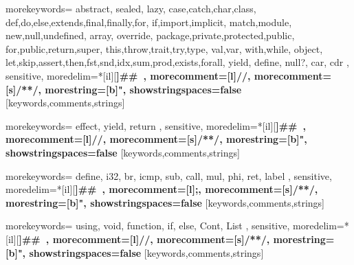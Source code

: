 

%
{morekeywords={
  abstract, sealed, lazy,
  case,catch,char,class,%
  def,do,else,extends,final,finally,for,%
  if,import,implicit,%
  match,module,%
  new,null,undefined,%
  array,
  override,%
  package,private,protected,public,%
  for,public,return,super,%
  this,throw,trait,try,type,%
  val,var,%
  with,while,%
  object,
  let,skip,assert,then,fst,snd,idx,sum,prod,exists,forall,%
  yield,%
  define, null?, car, cdr
  },%
  sensitive,%
  moredelim=*[il][\bfseries]{\#\#\ },
  morecomment=[l]//,%
  morecomment=[s]{/*}{*/},%
  morestring=[b]",%
  showstringspaces=false%
}[keywords,comments,strings]%

%
{morekeywords={
    effect, yield, return
  },%
  sensitive,%
  moredelim=*[il][\bfseries]{\#\#\ },
  morecomment=[l]//,%
  morecomment=[s]{/*}{*/},%
  morestring=[b]",%
  showstringspaces=false%
}[keywords,comments,strings]%

%
{morekeywords={
    define, i32, br, icmp, sub, call, mul, phi, ret, label
  },%
  sensitive,%
  moredelim=*[il][\bfseries]{\#\#\ },
  morecomment=[l];,%
  morecomment=[s]{/*}{*/},%
  morestring=[b]",%
  showstringspaces=false%
}[keywords,comments,strings]%

%
{morekeywords={
    using, void, function, if, else, Cont, List
  },%
  sensitive,%
  moredelim=*[il][\bfseries]{\#\#\ },
  morecomment=[l]//,%
  morecomment=[s]{/*}{*/},%
  morestring=[b]",%
  showstringspaces=false%
}[keywords,comments,strings]%



